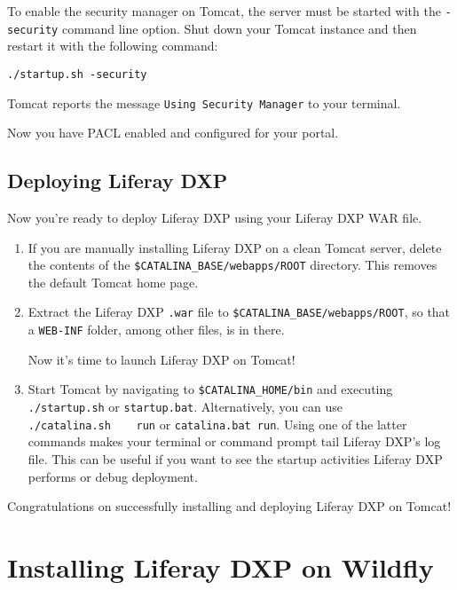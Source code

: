 To enable the security manager on Tomcat, the server must be started
with the \texttt{-security} command line option. Shut down your Tomcat
instance and then restart it with the following command:

\begin{verbatim}
./startup.sh -security
\end{verbatim}

Tomcat reports the message \texttt{Using\ Security\ Manager} to your
terminal.

Now you have PACL enabled and configured for your portal.

\subsection{Deploying Liferay DXP}\label{deploying-liferay-dxp-1}

Now you're ready to deploy Liferay DXP using your Liferay DXP WAR file.

\begin{enumerate}
\def\labelenumi{\arabic{enumi}.}
\item
  If you are manually installing Liferay DXP on a clean Tomcat server,
  delete the contents of the \texttt{\$CATALINA\_BASE/webapps/ROOT}
  directory. This removes the default Tomcat home page.
\item
  Extract the Liferay DXP \texttt{.war} file to
  \texttt{\$CATALINA\_BASE/webapps/ROOT}, so that a \texttt{WEB-INF}
  folder, among other files, is in there.

  Now it's time to launch Liferay DXP on Tomcat!
\item
  Start Tomcat by navigating to \texttt{\$CATALINA\_HOME/bin} and
  executing \texttt{./startup.sh} or \texttt{startup.bat}.
  Alternatively, you can use \texttt{./catalina.sh\ \ \ \ run} or
  \texttt{catalina.bat\ run}. Using one of the latter commands makes
  your terminal or command prompt tail Liferay DXP's log file. This can
  be useful if you want to see the startup activities Liferay DXP
  performs or debug deployment.
\end{enumerate}

Congratulations on successfully installing and deploying Liferay DXP on
Tomcat!

\section{Installing Liferay DXP on
Wildfly}\label{installing-liferay-dxp-on-wildfly}

